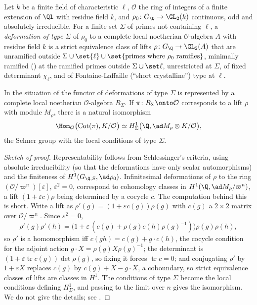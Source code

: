 \begin{definition}\label{def:congruence:deformation-ring}
Let $k$ be a finite field of characteristic $\ell$, $\mathcal O$ the ring of integers of a finite extension of $\Ql$ with residue field $k$, and $\rho_0\colon G_\Q\to\GL_2(k)$ continuous, odd and absolutely
irreducible. For a finite set $\Sigma$ of primes not containing $\ell$, a \emph{deformation of type $\Sigma$} of $\rho_0$ to a complete local noetherian $\mathcal O$-algebra $A$ with residue field $k$ is a strict
equivalence class of lifts $\rho\colon G_\Q\to\GL_2(A)$ that are unramified outside $\Sigma\cup\set{\ell}\cup\set{\text{primes where }\rho_0\text{ ramifies}}$, minimally ramified () at the
ramified primes outside $\Sigma\cup\set\ell$, unrestricted at $\Sigma$, of fixed determinant $\chi_\ell$, and of Fontaine-Laffaille (``short crystalline'') type at $\ell$.
\end{definition}

\begin{theorem}\label{thm:congruence:deformation-ring}
In the situation of  the functor of deformations of type $\Sigma$ is represented by a complete local noetherian $\mathcal O$-algebra $R_\Sigma$. If $\pi\colon R_\Sigma\onto\mathcal O$
corresponds to a lift $\rho$ with module $M_\rho$, there is a natural isomorphism
\[
\Hom_{\mathcal O}\bigl(\mathrm{Cot}(\pi),K/\mathcal O\bigr)\simeq H^1_\Sigma\bigl(\Q,\ad M_\rho\otimes K/\mathcal O\bigr),
\]
the Selmer group with the local conditions of type $\Sigma$.
\end{theorem}

\begin{proof}[Sketch of proof]
Representability follows from Schlessinger's criteria, using absolute irreducibility (so that the deformations have only scalar automorphisms) and the finiteness of
$H^1(G_{\Q,S},\ad\rho_0)$. Infinitesimal deformations of $\rho$ to the ring $(\mathcal O/\varpi^n)[\varepsilon]$, $\varepsilon^2=0$, correspond to cohomology classes in $H^1(\Q,\ad M_\rho/\varpi^n)$, a lift $(1+\varepsilon c)\rho$ being determined by a
cocycle $c$. The computation behind this is short. Write a lift as $\rho'(g)=(1+\varepsilon c(g))\rho(g)$ with $c(g)$ a $2\times2$ matrix over $\mathcal O/\varpi^n$. Since $\varepsilon^2=0$,
\[
\rho'(g)\rho'(h)=\bigl(1+\varepsilon\,(c(g)+\rho(g)c(h)\rho(g)^{-1})\bigr)\rho(g)\rho(h),
\]
so $\rho'$ is a homomorphism iff $c(gh)=c(g)+g\cdot c(h)$, the cocycle condition for the adjoint action $g\cdot X=\rho(g)X\rho(g)^{-1}$; the determinant is $(1+\varepsilon\operatorname{tr}c(g))\det\rho(g)$, so
fixing it forces $\operatorname{tr}c=0$; and conjugating $\rho'$ by $1+\varepsilon X$ replaces $c(g)$ by $c(g)+X-g\cdot X$, a coboundary, so strict equivalence classes of lifts are classes in $H^1$. The conditions of type $\Sigma$ become the local conditions defining $H^1_\Sigma$, and passing to the limit over $n$ gives the isomorphism. We do not give the details; see
\cite[Sections 2.2 to 2.8]{DDT}.
\end{proof}

